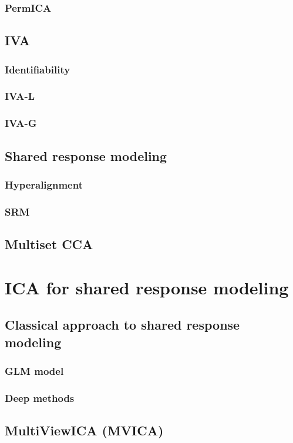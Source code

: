 \documentclass[12pt]{report}
\begin{document}
\subsection{PermICA}
\section{IVA}
\subsection{Identifiability}
\subsection{IVA-L}
\subsection{IVA-G}
\section{Shared response modeling}
\subsection{Hyperalignment}
\subsection{SRM}
\section{Multiset CCA}
\chapter{ICA for shared response modeling}
\section{Classical approach to shared response modeling}
\subsection{GLM model}
\subsection{Deep methods}
\section{MultiViewICA (MVICA)}
\end{document}
